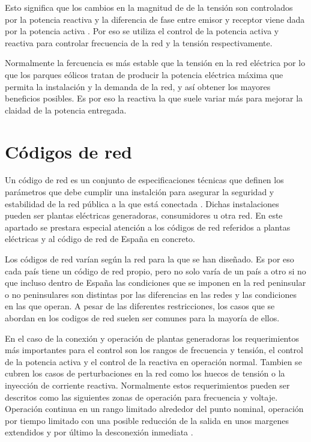 \documentclass{book}
\begin{document}
Esto significa que los cambios en la magnitud de de la tensi\'on son controlados por la potencia reactiva y la  diferencia de fase entre emisor y receptor viene dada por la potencia activa \cite{WFgridcode}. Por eso se utiliza el control de la potencia activa y reactiva para controlar frecuencia de la red y la tensi\'on respectivamente. \par

Normalmente la fercuencia es m\'as estable que la tensi\'on en la red el\'ectrica por lo que los parques e\'olicos tratan de producir la potencia el\'ectrica m\'axima que permita la instalaci\'on y la demanda de la red, y as\'i obtener los mayores beneficios posibles. Es por eso la reactiva la que suele variar m\'as para mejorar la claidad de la potencia entregada. \par


	\section{C\'odigos de red}

Un c\'odigo de red es un conjunto de especificaciones t\'ecnicas que definen los par\'ametros que debe cumplir una instalci\'on para asegurar la seguridad y estabilidad de la red p\'ublica a la que est\'a conectada  \cite{UKgridCode}. Dichas instalaciones pueden ser plantas el\'ectricas generadoras, consumidores u otra red. En este apartado se prestara especial atenci\'on a los c\'odigos de red referidos a plantas el\'ectricas y al c\'odigo de red de España en concreto. \par

Los c\'odigos de red var\'ian seg\'un la red para la que se han diseñado. Es por eso cada pa\'is tiene un c\'odigo de red propio, pero no solo var\'ia de un pa\'is a otro si no que incluso dentro de España las condiciones que se imponen en la red peninsular o no peninsulares son distintas por las diferencias en las redes y las condiciones en las que operan. A pesar de las diferentes restricciones, los casos que se abordan en los codigos de red suelen ser comunes para la mayor\'ia de ellos.  \par

En el caso de la conexi\'on y operaci\'on de plantas generadoras los requerimientos m\'as importantes para el control son los rangos de frecuencia y tensi\'on, el control de la potencia activa y el control de la reactiva en operaci\'on normal. Tambien se cubren los casos de perturbaciones en la red como los huecos de tensi\'on o la inyecci\'on de corriente reactiva. Normalmente estos requerimientos pueden ser descritos como las siguientes zonas de operaci\'on para frecuencia y voltaje. Operaci\'on continua en un rango limitado alrededor del punto nominal, operaci\'on por tiempo limitado con una posible reducci\'on de la salida en unos margenes extendidos y por \'ultimo la desconexi\'on inmediata \cite{GridCodeDeepAnalisys}.\par
\end{document}
